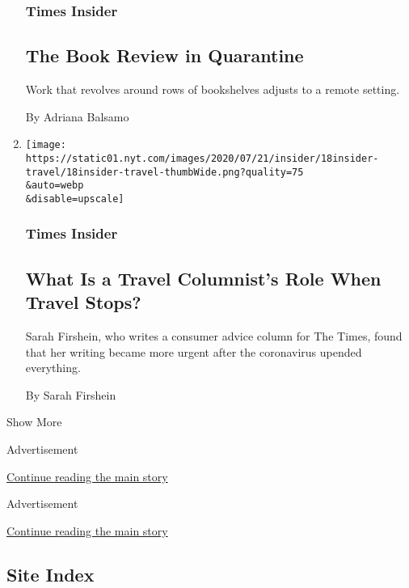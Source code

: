 \begin{enumerate}
  \hypertarget{times-insider-9}{%
  \subsubsection{Times Insider}\label{times-insider-9}}

  \hypertarget{the-book-review-in-quarantine}{%
  \subsection{The Book Review in
  Quarantine}\label{the-book-review-in-quarantine}}

  Work that revolves around rows of bookshelves adjusts to a remote
  setting.

  By Adriana Balsamo
\item
  \href{/2020/07/18/insider/travel-writing-pandemic.html}{}

  \texttt{[image: https://static01.nyt.com/images/2020/07/21/insider/18insider-travel/18insider-travel-thumbWide.png?quality=75\\\&auto=webp\\\&disable=upscale]}

  \hypertarget{times-insider-10}{%
  \subsubsection{Times Insider}\label{times-insider-10}}

  \hypertarget{what-is-a-travel-columnists-role-when-travel-stops}{%
  \subsection{What Is a Travel Columnist's Role When Travel
  Stops?}\label{what-is-a-travel-columnists-role-when-travel-stops}}

  Sarah Firshein, who writes a consumer advice column for The Times,
  found that her writing became more urgent after the coronavirus
  upended everything.

  By Sarah Firshein
\end{enumerate}

Show More

Advertisement

\protect\hyperlink{after-mid1}{Continue reading the main story}

Advertisement

\protect\hyperlink{after-mktg}{Continue reading the main story}

\hypertarget{site-index}{%
\subsection{Site Index}\label{site-index}}

